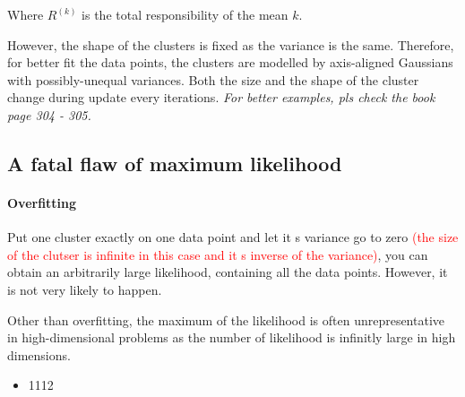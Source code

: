 \documentclass[11pt]{article}
\begin{document}
Where $R^{(k)}$ is the total responsibility of the mean $k$.


However, the shape of the clusters is fixed as the variance is the same. Therefore, for better fit the data points, the clusters are modelled by axis-aligned Gaussians with possibly-unequal variances. Both the size and the shape of the cluster change during update every iterations. \textit{For better examples, pls check the book page 304 - 305.}

\subsection{A fatal flaw of maximum likelihood}
\paragraph{Overfitting}
Put one cluster exactly on one data point and let it \textquotesingle s variance go to zero \textcolor{red}{(the size of the clutser is infinite in this case and it \textquotesingle s inverse of the variance)}, you can obtain an arbitrarily large likelihood, containing all the data points. However, it is not very likely to happen. 

Other than overfitting, the maximum of the likelihood is often unrepresentative in high-dimensional problems as the number of likelihood is infinitly large in high dimensions.







\begin{itemize}
  \item 1112
\end{itemize}
\end{document}
